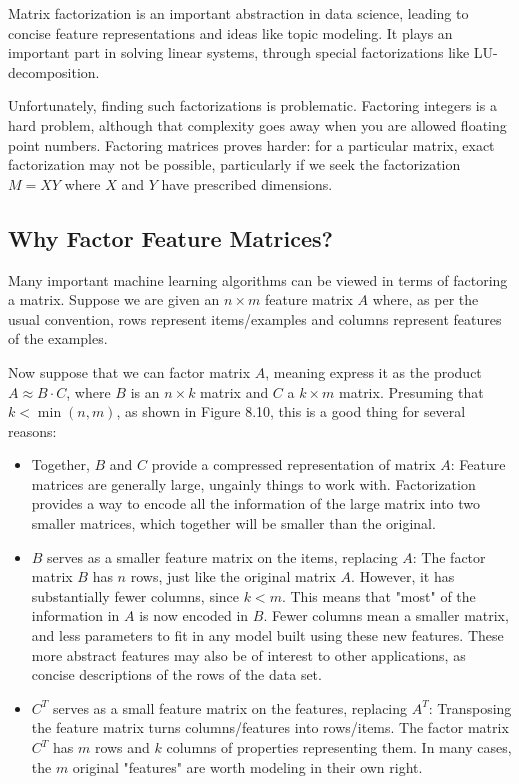 \documentclass[10pt]{article}
\begin{document}
Matrix factorization is an important abstraction in data science, leading to concise feature representations and ideas like topic modeling. It plays an important part in solving linear systems, through special factorizations like LU-decomposition.

Unfortunately, finding such factorizations is problematic. Factoring integers is a hard problem, although that complexity goes away when you are allowed floating point numbers. Factoring matrices proves harder: for a particular matrix, exact factorization may not be possible, particularly if we seek the factorization \(M=XY\) where \(X\) and \(Y\) have prescribed dimensions.

\subsection*{Why Factor Feature Matrices?}
Many important machine learning algorithms can be viewed in terms of factoring a matrix. Suppose we are given an \(n \times m\) feature matrix \(A\) where, as per the usual convention, rows represent items/examples and columns represent features of the examples.

Now suppose that we can factor matrix \(A\), meaning express it as the product \(A \approx B \cdot C\), where \(B\) is an \(n \times k\) matrix and \(C\) a \(k \times m\) matrix. Presuming that \(k<\min(n, m)\), as shown in Figure 8.10, this is a good thing for several reasons:

\begin{itemize}
  \item Together, \(B\) and \(C\) provide a compressed representation of matrix \(A\): Feature matrices are generally large, ungainly things to work with. Factorization provides a way to encode all the information of the large matrix into two smaller matrices, which together will be smaller than the original.
  \item \(B\) serves as a smaller feature matrix on the items, replacing \(A\): The factor matrix \(B\) has \(n\) rows, just like the original matrix \(A\). However, it has substantially fewer columns, since \(k<m\). This means that "most" of the information in \(A\) is now encoded in \(B\). Fewer columns mean a smaller matrix, and less parameters to fit in any model built using these new features. These more abstract features may also be of interest to other applications, as concise descriptions of the rows of the data set.
  \item \(C^{T}\) serves as a small feature matrix on the features, replacing \(A^{T}\): Transposing the feature matrix turns columns/features into rows/items. The factor matrix \(C^{T}\) has \(m\) rows and \(k\) columns of properties representing them. In many cases, the \(m\) original "features" are worth modeling in their own right.
\end{itemize}
\end{document}
